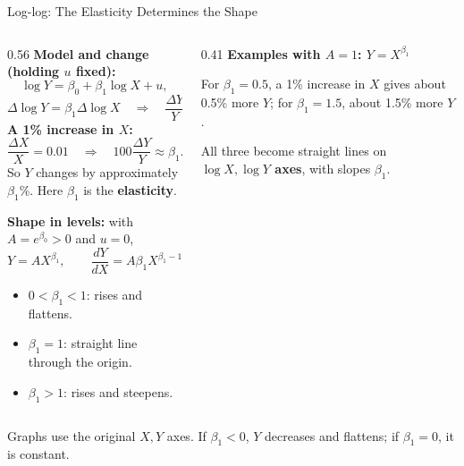\documentclass[notes,10pt, aspectratio=169]{beamer}
\begin{document}
\begin{frame}{Log-log: The Elasticity Determines the Shape}
\small
\setlength{\abovedisplayskip}{4pt}
\setlength{\belowdisplayskip}{4pt}
\setlength{\abovedisplayshortskip}{2pt}
\setlength{\belowdisplayshortskip}{2pt}
\begin{columns}[T]
\begin{column}{0.56\textwidth}
\textbf{Model and change (holding $u$ fixed):}
\[
\log Y=\beta_0+\beta_1\log X+u,
\]
\[
\Delta\log Y=\beta_1\Delta\log X
\quad\Rightarrow\quad
\frac{\Delta Y}{Y}\approx\beta_1\frac{\Delta X}{X}.
\]
\textbf{A 1\% increase in $X$:}
\[
\frac{\Delta X}{X}=0.01
\quad\Rightarrow\quad
100\frac{\Delta Y}{Y}\approx\beta_1.
\]
So $Y$ changes by approximately $\beta_1$\%. Here $\beta_1$ is the \textbf{elasticity}.
\vspace{3pt}

\textbf{Shape in levels:} with $A=e^{\beta_0}>0$ and $u=0$,
\[
Y=AX^{\beta_1},
\qquad\boxed{\frac{dY}{dX}=A\beta_1X^{\beta_1-1}.}
\]
\begin{itemize}\setlength{\itemsep}{1pt}
\item $0<\beta_1<1$: rises and flattens.
\item $\beta_1=1$: straight line through the origin.
\item $\beta_1>1$: rises and steepens.
\end{itemize}
\end{column}
\begin{column}{0.41\textwidth}
\centering
\textbf{Examples with $A=1$: $Y=X^{\beta_1}$}


\vspace{3pt}
\raggedright
For $\beta_1=0.5$, a 1\% increase in $X$ gives about 0.5\% more $Y$; for $\beta_1=1.5$, about 1.5\% more $Y$.
\vspace{3pt}

All three become straight lines on \textbf{$\log X,\log Y$ axes}, with slopes $\beta_1$.
\end{column}
\end{columns}
\vspace{3pt}
{\scriptsize Graphs use the original $X,Y$ axes. If $\beta_1<0$, $Y$ decreases and flattens; if $\beta_1=0$, it is constant.}
\end{frame}
\end{document}
